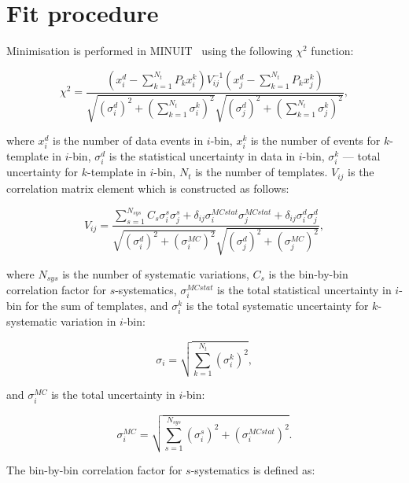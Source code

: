 \documentclass[12pt]{article}
\begin{document}
\section{Fit procedure}

Minimisation is performed in MINUIT~\cite{Minuit} using the following
$\chi^2$ function:

\begin{equation}
\chi^2 = \frac{
(x^{d}_{i}-\sum\limits_{k=1}^{N_{t}}P_{k}x^{k}_{i})
V_{ij}^{-1}
(x^{d}_{j}-\sum\limits_{k=1}^{N_{t}}P_{k}x^{k}_{j})
}
{\sqrt{
(\sigma_{i}^{d})^2 +
(\sum\limits_{k=1}^{N_{t}}\sigma_{i}^{k})^2
}
\sqrt{
(\sigma_{j}^{d})^2 +
(\sum\limits_{k=1}^{N_{t}}\sigma_{j}^{k})^2
}
},
\end{equation}

\noindent where $x^{d}_{i}$ is the number of data events in $i$-bin,
$x^{k}_{i}$ is the number of events for $k$-template in $i$-bin,
$\sigma_{i}^{d}$ is the statistical uncertainty in data in $i$-bin,
$\sigma_{i}^{k}$ --- total uncertainty for $k$-template in $i$-bin,
$N_{t}$ is the number of templates.
$V_{ij}$ is the correlation matrix element which is constructed as follows:

\begin{equation}
V_{ij} = \frac{\sum\limits_{s=1}^{N_{sys}} C_{s}
\sigma_{i}^{s}\sigma_{j}^{s} +
\delta_{ij}\sigma_{i}^{MCstat}\sigma_{j}^{MCstat} +
\delta_{ij}\sigma_{i}^{d}\sigma_{j}^{d}}
{\sqrt{
(\sigma_{i}^{d})^2 +
(\sigma_{i}^{MC})^2
}
\sqrt{
(\sigma_{j}^{d})^2 +
(\sigma_{j}^{MC})^2
}
},
\end{equation}

\noindent where $N_{sys}$ is the number of systematic variations,
$C_{s}$ is the bin-by-bin correlation factor for $s$-systematics,
$\sigma_{i}^{MCstat}$ is the total statistical uncertainty in $i$-bin
for the sum of templates, and $\sigma_{i}^{k}$ is the total
systematic uncertainty for $k$-systematic variation in $i$-bin:

\begin{equation}
\sigma_{i} = \sqrt{\sum\limits_{k=1}^{N_{t}}(\sigma_{i}^{k})^{2}},
\end{equation}

\noindent and $\sigma_{i}^{MC}$ is the total uncertainty in $i$-bin:

\begin{equation}
\sigma_{i}^{MC} = \sqrt{\sum\limits_{s=1}^{N_{sys}}(\sigma_{i}^{s})^2+(\sigma_{i}^{MCstat})^2}.
\end{equation}

\noindent The bin-by-bin correlation factor for $s$-systematics is
defined as:
\end{document}
